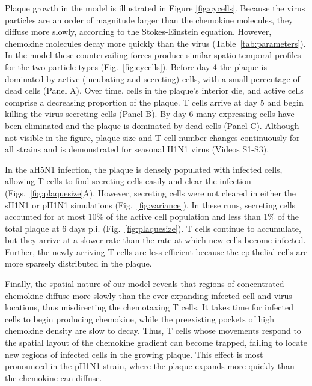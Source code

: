 \documentclass[10pt]{article}
\begin{document}

Plaque growth in the model is illustrated in Figure \ref{fig:cycells}.  Because the virus particles are an order of magnitude larger than the chemokine molecules, they diffuse more slowly, according to the Stokes-Einstein equation.  However, chemokine molecules decay more quickly than the virus (Table~\ref{tab:parameters}).  In the model these countervailing forces produce similar spatio-temporal profiles for the two particle types (Fig.~\ref{fig:cycells}). Before day 4 the plaque is dominated by active (incubating and secreting) cells, with a small percentage of dead cells (Panel A). Over time, cells in the plaque's interior die, and active cells comprise a decreasing proportion of the plaque. T cells arrive at day 5 and begin killing the virus-secreting cells (Panel B). By day 6 many expressing cells have been eliminated and the plaque is dominated by dead cells (Panel C).  Although not visible in the figure, plaque size and T cell number changes continuously for all strains and is demonstrated for seasonal H1N1 virus (Videos S1-S3).

In the aH5N1 infection, the plaque is densely populated with infected cells, allowing T cells to find secreting cells easily and clear the infection (Figs.~\ref{fig:plaquesize}A).  However, secreting cells were not cleared in either the sH1N1 or pH1N1 simulations (Fig.~\ref{fig:variance}).  In these runs, secreting cells accounted for at most 10\% of the active cell population and less than 1\% of the total plaque at 6 days p.i. (Fig.~\ref{fig:plaquesize}).  T cells continue to accumulate, but they arrive at a slower rate than the rate at which new cells become infected.  Further, the newly arriving T cells are less efficient because the epithelial cells are more sparsely distributed in the plaque.

Finally, the spatial nature of our model reveals that regions of concentrated chemokine diffuse more slowly than the ever-expanding infected cell and virus locations, thus misdirecting the chemotaxing T cells.  It takes time for infected cells to begin producing chemokine, while the preexisting pockets of high chemokine density are slow to decay.  Thus, T cells whose movements respond to the spatial layout of the chemokine gradient can become trapped, failing to locate new regions of infected cells in the growing plaque.  This effect is most pronounced in the pH1N1 strain, where the plaque expands more quickly than the chemokine can diffuse.
\end{document}

